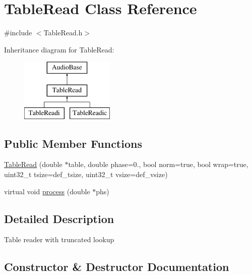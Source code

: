 \hypertarget{class_table_read}{}\section{Table\+Read Class Reference}
\label{class_table_read}


{\ttfamily \#include $<$Table\+Read.\+h$>$}

Inheritance diagram for Table\+Read\+:\begin{figure}[H]
\begin{center}
\leavevmode
\includegraphics[height=3.000000cm]{class_table_read}
\end{center}
\end{figure}
\subsection*{Public Member Functions}
\begin{DoxyCompactItemize}
\item 
\hyperlink{class_table_read_a0ca6b6a46416b6ae1a48af6a490de9ff}{Table\+Read} (double $\ast$table, double phase=0., bool norm=true, bool wrap=true, uint32\+\_\+t tsize=def\+\_\+tsize, uint32\+\_\+t vsize=def\+\_\+vsize)
\item 
virtual void \hyperlink{class_table_read_ada219536a398309150f5f1270ac9534e}{process} (double $\ast$phs)
\end{DoxyCompactItemize}


\subsection{Detailed Description}
Table reader with truncated lookup 

\subsection{Constructor \& Destructor Documentation}
\mbox{\label{class_table_read_a0ca6b6a46416b6ae1a48af6a490de9ff}} 
